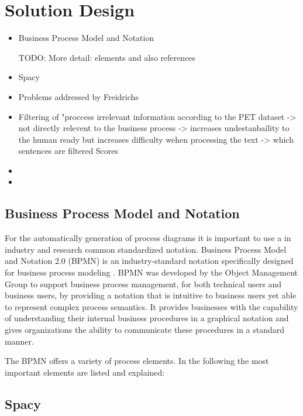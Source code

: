 \chapter{Solution Design}
\label{sec:solution}
\begin{itemize}
\item Business Process Model and Notation


TODO: More detail: elements and also references

\item Spacy



\item Problems addressed by Freidrichs


\item Filtering of "proccess irrelevant information according to the PET dataset -> not directly relevent to the business process -> increases undestanbaility to the human ready but increases difficulty wehen processing the text -> which sentences are filtered Scores
\item 
\item 
\end{itemize}

\section{Business Process Model and Notation}
For the automatically generation of process diagrams it is important to use a in industry and research common standardized notation. Business Process Model and Notation 2.0 (BPMN) is an industry-standard notation specifically designed for business process modeling \cite{aagesenBPMNModelingBusiness2015}. BPMN was developed by the Object Management Group to support business process management, for both technical users and business users, by providing a notation that is intuitive to business users yet able to represent complex process semantics. It provides businesses with the capability of understanding their internal business procedures in a graphical notation and gives organizations the ability to communicate these procedures in a standard manner. 

\cite{BusinessProcessModel}
The BPMN offers a variety of process elements. In the following the most important elements are listed and explained:




\section{Spacy}
